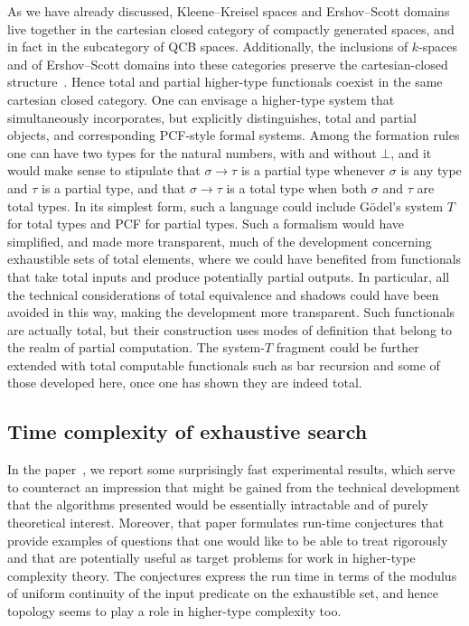 \documentclass{LMCS}
\begin{document}
As we have already discussed, Kleene--Kreisel spaces and Ershov--Scott
domains live together in the cartesian closed category of compactly
generated spaces, and in fact in the subcategory of QCB spaces.
Additionally, the inclusions of $k$-spaces and of Ershov--Scott
domains into these categories preserve the cartesian-closed
structure~\cite{escardo:lawson:simpson,MR2328287}.  Hence total and
partial higher-type functionals coexist in the same cartesian closed
category.  One can envisage a higher-type system that simultaneously
incorporates, but explicitly distinguishes, total and partial objects,
and corresponding PCF-style formal systems. Among the formation rules
one can have two types for the natural numbers, with and without
$\bot$, and it would make sense to stipulate that $\sigma \to \tau$ is
a partial type whenever $\sigma$ is any type and $\tau$ is a partial
type, and that $\sigma \to \tau$ is a total type when both $\sigma$
and $\tau$ are total types. In its simplest form, such a language
could include G\"odel's system $T$ for total types and PCF for partial
types. Such a formalism would have simplified, and made more
transparent, much of the development concerning exhaustible sets of
total elements, where we could have benefited from functionals that
take total inputs and produce potentially partial outputs.  In
particular, all the technical considerations of total equivalence and
shadows could have been avoided in this way, making the development
more transparent. Such functionals are actually total, but their
construction uses modes of definition that belong to the realm of
partial computation. The system-$T$ fragment could be further extended
with total computable functionals such as bar recursion and some of
those developed here, once one has shown they are indeed total.

\subsection{Time complexity of exhaustive search}

In the paper~\cite{escardo:lics07}, we report some surprisingly fast
experimental results, which serve to counteract an impression that
might be gained from the technical development that the algorithms
presented would be essentially intractable and of purely theoretical
interest. Moreover, that paper formulates run-time conjectures that
provide examples of questions that one would like to be able to treat
rigorously and that are potentially useful as target problems for work
in higher-type complexity theory.  The conjectures express the run
time in terms of the modulus of uniform continuity of the input
predicate on the exhaustible set, and hence topology seems to play a
role in higher-type complexity too.
\end{document}
